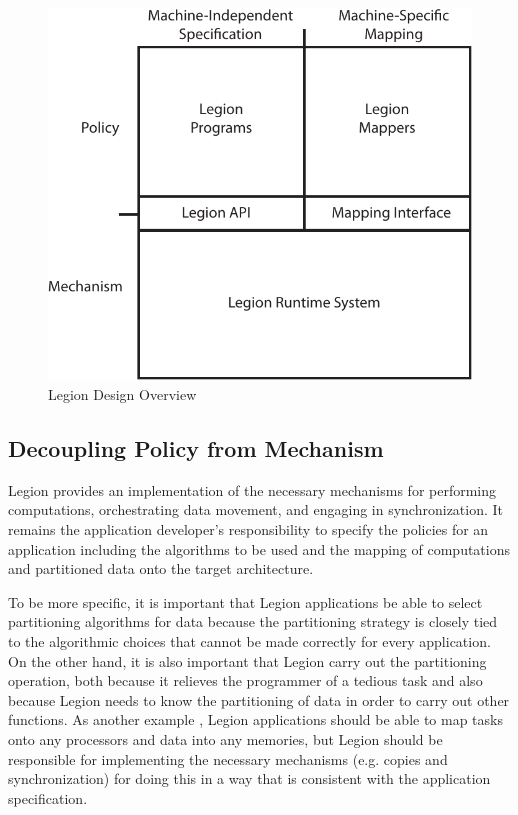 \begin{figure}[ht]
\centering
\includegraphics[scale=0.7]{figs/legiondesign.pdf}
\caption{Legion Design Overview\label{fig:legiondesign}}
\end{figure}

\subsection{Decoupling Policy from Mechanism}
\label{subsec:mechanism}
Legion provides an
implementation of the necessary mechanisms
for performing computations, orchestrating
data movement, and engaging in synchronization.
It remains the application developer's
responsibility to specify the policies for
an application including the algorithms to
be used and the mapping of computations and
partitioned data onto the target architecture.

To be more specific,
it is important that Legion applications
be able to select partitioning algorithms
for data because the partitioning strategy is
closely tied to the algorithmic choices that
cannot be made correctly for every application.
On the other hand, it is also important that
Legion carry out the partitioning operation,
both because it relieves the programmer of a
tedious task and also because Legion needs
to know the partitioning of data in order to
carry out other functions. As another example
, Legion applications should be able to map 
tasks onto any processors and data into any 
memories, but Legion should be responsible 
for implementing the necessary mechanisms 
(e.g. copies and synchronization)
for doing this in a way that is consistent
with the application specification.

